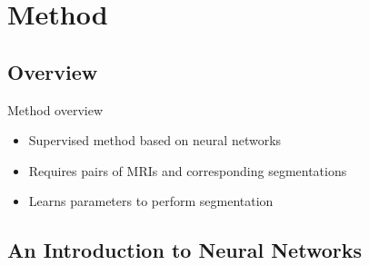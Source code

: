 \documentclass{beamer}
\begin{document}
\section{Method}

\subsection{Overview}

\begin{frame}{Method overview}
\begin{itemize}
\item Supervised method based on neural networks
\item Requires pairs of MRIs and corresponding segmentations
\item Learns parameters to perform segmentation
\end{itemize}
\end{frame}

\subsection{An Introduction to Neural Networks}

\end{document}
